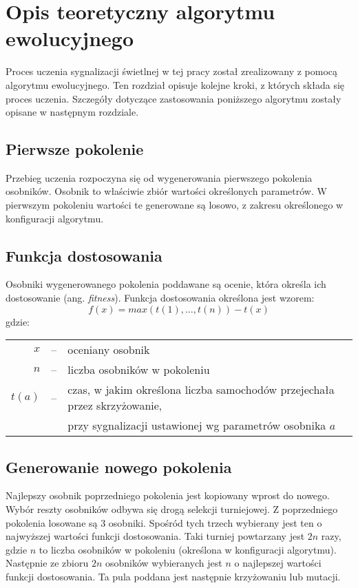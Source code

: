 \chapter*{Opis teoretyczny algorytmu ewolucyjnego}
Proces uczenia sygnalizacji świetlnej w tej pracy został zrealizowany z pomocą algorytmu ewolucyjnego. Ten rozdział opisuje kolejne kroki, z których składa się proces uczenia. Szczegóły dotyczące zastosowania poniższego algorytmu zostały opisane w następnym rozdziale.
\section*{Pierwsze pokolenie}
Przebieg uczenia rozpoczyna się od wygenerowania pierwszego pokolenia osobników. Osobnik to właściwie zbiór wartości określonych parametrów. W pierwszym pokoleniu wartości te generowane są losowo, z zakresu określonego w konfiguracji algorytmu. 
\section*{Funkcja dostosowania}
Osobniki wygenerowanego pokolenia poddawane są ocenie, która określa ich dostosowanie (ang. \textit{fitness}). Funkcja dostosowania określona jest wzorem:
\begin{equation}
f(x) = max(t(1),\ldots, t(n)) - t(x)
\label{fitness}
\end{equation} 
gdzie:\\
\begin{tabularx}{\textwidth}{ r c l }
$x$ & -- & oceniany osobnik\\
$n$ & -- & liczba osobników w pokoleniu\\
$t(a)$ & -- & czas, w jakim określona liczba samochodów przejechała przez skrzyżowanie,\\ &&przy sygnalizacji ustawionej wg parametrów osobnika $ a $
\end{tabularx}
\section*{Generowanie nowego pokolenia}
Najlepszy osobnik poprzedniego pokolenia jest kopiowany wprost do nowego. 
Wybór reszty osobników odbywa się drogą selekcji turniejowej. Z poprzedniego pokolenia losowane są 3 osobniki. Spośród tych trzech wybierany jest ten o najwyższej wartości funkcji dostosowania. Taki turniej powtarzany jest $2n$ razy, gdzie $n$ to liczba osobników w pokoleniu (określona w konfiguracji algorytmu). Następnie ze zbioru $2n$ osobników wybieranych jest $n$ o najlepszej wartości funkcji dostosowania. Ta pula poddana jest następnie krzyżowaniu lub mutacji.
